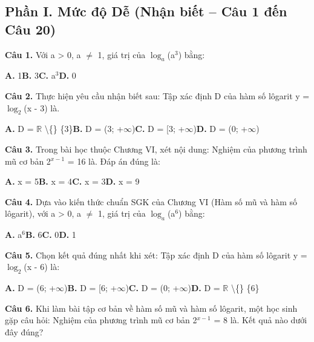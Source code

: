 \documentclass[11pt,a4paper]{article}
\begin{document}
\subsection*{\color{accent} Phần I. Mức độ Dễ (Nhận biết -- Câu 1 đến Câu 20)}
\textbf{\color{primary} Câu 1.} Với a > 0, a $\ne$ 1, giá trị của $\log_a$(a$^{3}$) bằng:\par
\hspace*{1.5em}\textbf{A.} 1\quad\quad \textbf{B.} 3\quad\quad \textbf{C.} a$^{3}$\quad\quad \textbf{D.} 0\par\vspace{2pt}
\textbf{\color{primary} Câu 2.} Thực hiện yêu cầu nhận biết sau: Tập xác định D của hàm số lôgarit y = $\log_2$(x - 3) là.\par
\hspace*{1.5em}\textbf{A.} D = $\mathbb{R}$ \textbackslash\{\} \{3\}\quad\quad \textbf{B.} D = (3; +$\infty$)\quad\quad \textbf{C.} D = [3; +$\infty$)\quad\quad \textbf{D.} D = (0; +$\infty$)\par\vspace{2pt}
\textbf{\color{primary} Câu 3.} Trong bài học thuộc Chương VI, xét nội dung: Nghiệm của phương trình mũ cơ bản 2$^{x - 1}$ = 16 là. Đáp án đúng là:\par
\hspace*{1.5em}\textbf{A.} x = 5\quad\quad \textbf{B.} x = 4\quad\quad \textbf{C.} x = 3\quad\quad \textbf{D.} x = 9\par\vspace{2pt}
\textbf{\color{primary} Câu 4.} Dựa vào kiến thức chuẩn SGK của Chương VI (Hàm số mũ và hàm số lôgarit), với a > 0, a $\ne$ 1, giá trị của $\log_a$(a$^{6}$) bằng:\par
\hspace*{1.5em}\textbf{A.} a$^{6}$\quad\quad \textbf{B.} 6\quad\quad \textbf{C.} 0\quad\quad \textbf{D.} 1\par\vspace{2pt}
\textbf{\color{primary} Câu 5.} Chọn kết quả đúng nhất khi xét: Tập xác định D của hàm số lôgarit y = $\log_2$(x - 6) là:\par
\hspace*{1.5em}\textbf{A.} D = (6; +$\infty$)\quad\quad \textbf{B.} D = [6; +$\infty$)\quad\quad \textbf{C.} D = (0; +$\infty$)\quad\quad \textbf{D.} D = $\mathbb{R}$ \textbackslash\{\} \{6\}\par\vspace{2pt}
\textbf{\color{primary} Câu 6.} Khi làm bài tập cơ bản về hàm số mũ và hàm số lôgarit, một học sinh gặp câu hỏi: Nghiệm của phương trình mũ cơ bản 2$^{x - 1}$ = 8 là. Kết quả nào dưới đây đúng?\par
\end{document}
